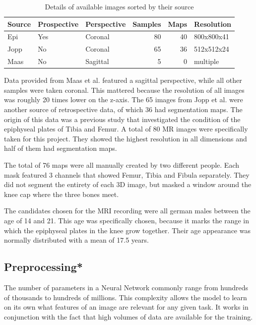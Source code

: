 \begin{table}[h!]
\centering
\begin{tabular}{l l l r r l}
    Source & Prospective & Perspective & Samples & Maps & Resolution \\
    \hline
    Epi    & Yes         & Coronal     & 80      & 40   & 800x800x41 \\
    Jopp   & No          & Coronal     & 65      & 36   & 512x512x24 \\
    Maas   & No          & Sagittal    & 5       & 0    & multiple \\
\end{tabular}
\caption{Details of available images sorted by their source}
\end{table}

Data provided from Maas et al. featured a sagittal perspective, while all other samples were taken coronal. This mattered because the resolution of all images was roughly 20 times lower on the z-axis. The 65 images from Jopp et al. were another source of retrospective data, of which 36 had segmentation maps. The origin of this data was a previous study that investigated the condition of the epiphyseal plates of Tibia and Femur. A total of 80 MR images were specifically taken for this project. They showed the highest resolution in all dimensions and half of them had segmentation maps.

The total of 76 maps were all manually created by two different people. Each mask featured 3 channels that showed Femur, Tibia and Fibula separately. They did not segment the entirety of each 3D image, but masked a window around the knee cap where the three bones meet.

The candidates chosen for the MRI recording were all german males between the age of 14 and 21. This age was specifically chosen, because it marks the range in which the epiphyseal plates in the knee grow together. Their age appearance was normally distributed with a mean of 17.5 years.

\subsection{Preprocessing*}

The number of parameters in a Neural Network commonly range from hundreds of thousands to hundreds of millions. This complexity allows the model to learn on its own what features of an image are relevant for any given task. It works in conjunction with the fact that high volumes of data are available for the training.

